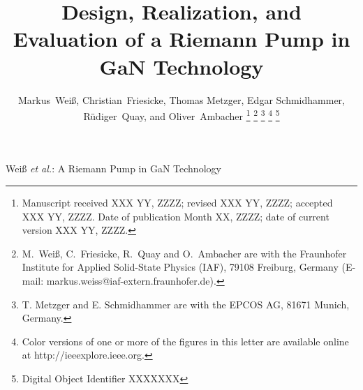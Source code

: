 \documentclass[journal]{IEEEtran}
\begin{document}
\title{Design, Realization, and Evaluation of a Riemann Pump in GaN Technology}
\author{%
	Markus~Wei\ss{},
    Christian~Friesicke,
	Thomas Metzger,    
    Edgar Schmidhammer,
    R\"{u}diger~Quay,
    and Oliver~Ambacher 
    \thanks{%
      Manuscript received XXX YY, ZZZZ;
      revised XXX YY, ZZZZ;
      accepted XXX YY, ZZZZ.
      Date of publication Month XX, ZZZZ;
      date of current version XXX YY, ZZZZ.      
    }%
    \thanks{M.~Wei\ss{}, C.~Friesicke, R.~Quay and O.~Ambacher are with the Fraunhofer Institute for Applied Solid-State
      Physics (IAF), 79108 Freiburg, Germany (E-mail: markus.weiss@iaf-extern.fraunhofer.de).%
    }%
    \thanks{
      T. Metzger and E. Schmidhammer are with the EPCOS AG, 81671 Munich, Germany.%
    }%
    \thanks{%
      Color versions of one or more of the figures in this letter are available
      online at http://ieeexplore.ieee.org.}
    \thanks{%
      Digital Object Identifier XXXXXXX%
    }%
}

%
         {Wei\ss{} \MakeLowercase{\textit{et al.}}:
          A Riemann Pump in GaN Technology}
\maketitle


\end{document}
